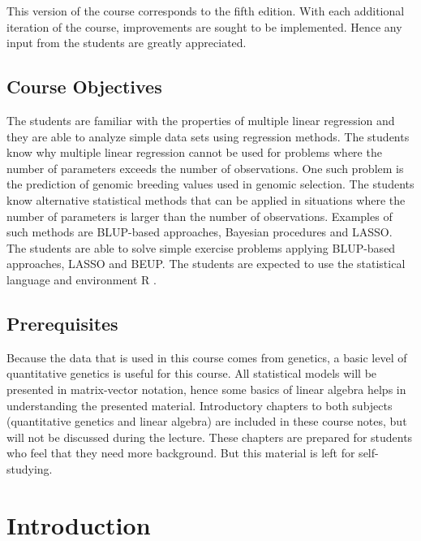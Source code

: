 \documentclass[
]{book}
\theoremstyle{definition}
\theoremstyle{definition}
\theoremstyle{definition}
\theoremstyle{remark}
\begin{document}
This version of the course corresponds to the fifth edition. With each additional iteration of the course, improvements are sought to be implemented. Hence any input from the students are greatly appreciated.

\hypertarget{course-objectives}{%
\section*{Course Objectives}\label{course-objectives}}

The students are familiar with the properties of multiple linear regression and they are able to analyze simple data sets using regression methods. The students know why multiple linear regression cannot be used for problems where the number of parameters exceeds the number of observations. One such problem is the prediction of genomic breeding values used in genomic selection. The students know alternative statistical methods that can be applied in situations where the number of parameters is larger than the number of observations. Examples of such methods are BLUP-based approaches, Bayesian procedures and LASSO. The students are able to solve simple exercise problems applying BLUP-based approaches, LASSO and BEUP. The students are expected to use the statistical language and environment R \citep{RCoreTeam2018}.

\hypertarget{prerequisites}{%
\section*{Prerequisites}\label{prerequisites}}

Because the data that is used in this course comes from genetics, a basic level of quantitative genetics is useful for this course. All statistical models will be presented in matrix-vector notation, hence some basics of linear algebra helps in understanding the presented material. Introductory chapters to both subjects (quantitative genetics and linear algebra) are included in these course notes, but will not be discussed during the lecture. These chapters are prepared for students who feel that they need more background. But this material is left for self-studying.

\hypertarget{asm-intro}{%
\chapter{Introduction}\label{asm-intro}}
\end{document}
